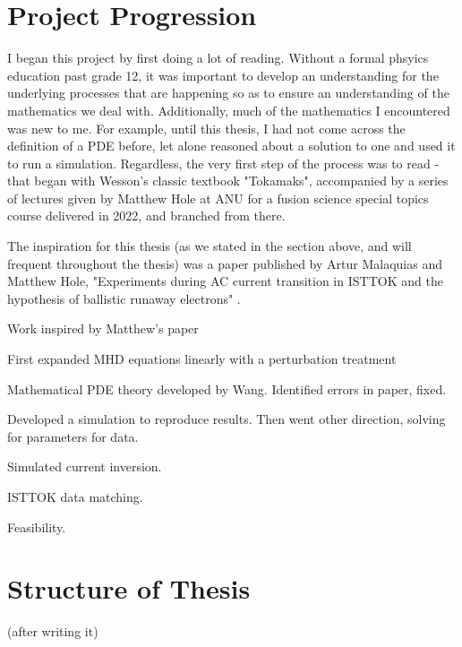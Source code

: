 \TODO

\section{Project Progression}

I began this project by first doing a lot of reading. Without a formal phsyics education past grade 12, it was 
important to develop an understanding for the underlying processes that are happening so as to ensure an understanding 
of the mathematics we deal with. Additionally, much of the mathematics I encountered was new to me. For example, until this thesis, I had 
not come across the definition of a PDE before, let alone reasoned about a solution to one and used it to run a simulation. Regardless, 
the very first step of the process was to read - that began with Wesson's classic textbook "Tokamaks", accompanied by a series of lectures 
given by Matthew Hole at ANU for a fusion science special topics course delivered in 2022, and branched from there.

The inspiration for this thesis (as we stated in the section above, and will frequent throughout the thesis) was a paper 
published by Artur Malaquias and Matthew Hole, "Experiments during AC current transition in ISTTOK and the hypothesis of ballistic 
runaway electrons" \cite{malaquias-matthew}.

\TODO

Work inspired by Matthew's paper 

First expanded MHD equations linearly with a perturbation treatment

Mathematical PDE theory developed by Wang. Identified errors in paper, fixed. 

Developed a simulation to reproduce results. Then went other direction, 
solving for parameters for data. 

Simulated current inversion.

ISTTOK data matching.

Feasibility.



\section{Structure of Thesis}

\TODO (after writing it)
